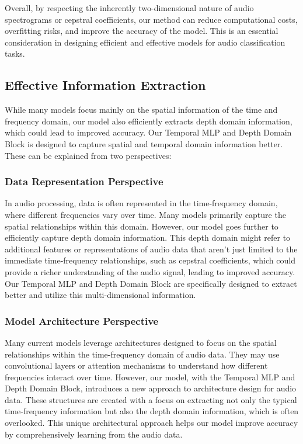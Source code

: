 \documentclass[runningheads]{llncs}
\begin{document}
Overall, by respecting the inherently two-dimensional nature of audio spectrograms or cepstral coefficients, our method can reduce computational costs, overfitting risks, and improve the accuracy of the model. This is an essential consideration in designing efficient and effective models for audio classification tasks.

\subsection{Effective Information Extraction} While many models focus mainly on the spatial information of the time and frequency domain, our model also efficiently extracts depth domain information, which could lead to improved accuracy. Our Temporal MLP and Depth Domain Block is designed to capture spatial and temporal domain information better. These can be explained from two perspectives:

\subsubsection{Data Representation Perspective} In audio processing, data is often represented in the time-frequency domain, where different frequencies vary over time. Many models primarily capture the spatial relationships within this domain. However, our model goes further to efficiently capture depth domain information. This depth domain might refer to additional features or representations of audio data that aren't just limited to the immediate time-frequency relationships, such as cepstral coefficients, which could provide a richer understanding of the audio signal, leading to improved accuracy. Our Temporal MLP and Depth Domain Block are specifically designed to extract better and utilize this multi-dimensional information.

\subsubsection{Model Architecture Perspective} Many current models leverage architectures designed to focus on the spatial relationships within the time-frequency domain of audio data. They may use convolutional layers or attention mechanisms to understand how different frequencies interact over time. However, our model, with the Temporal MLP and Depth Domain Block, introduces a new approach to architecture design for audio data. These structures are created with a focus on extracting not only the typical time-frequency information but also the depth domain information, which is often overlooked. This unique architectural approach helps our model improve accuracy by comprehensively learning from the audio data.
\end{document}

